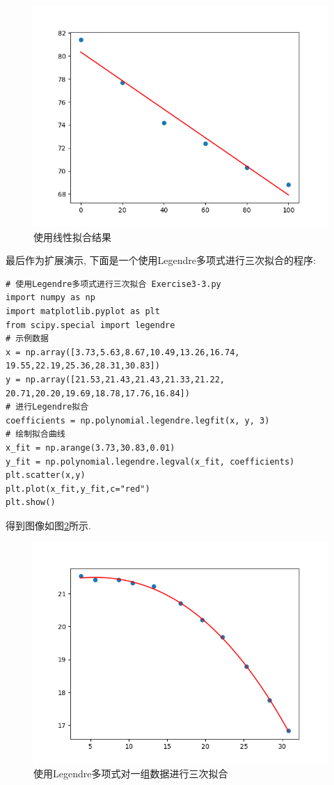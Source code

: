 \begin{figure}[h]
    \centering
    \includegraphics[width=1\linewidth]{Chapter3/graph/python/Figure3-1.png}
    \caption{使用线性拟合结果}
    \label{fig:使用线性拟合结果}
\end{figure}

最后作为扩展演示, 下面是一个使用Legendre多项式进行三次拟合的程序:

\begin{lstlisting}
# 使用Legendre多项式进行三次拟合 Exercise3-3.py
import numpy as np
import matplotlib.pyplot as plt
from scipy.special import legendre
# 示例数据
x = np.array([3.73,5.63,8.67,10.49,13.26,16.74,
19.55,22.19,25.36,28.31,30.83])
y = np.array([21.53,21.43,21.43,21.33,21.22,
20.71,20.20,19.69,18.78,17.76,16.84])
# 进行Legendre拟合
coefficients = np.polynomial.legendre.legfit(x, y, 3)
# 绘制拟合曲线
x_fit = np.arange(3.73,30.83,0.01)
y_fit = np.polynomial.legendre.legval(x_fit, coefficients)
plt.scatter(x,y)
plt.plot(x_fit,y_fit,c="red")
plt.show()
\end{lstlisting}

得到图像如图\ref{fig:使用Legendre多项式进行三次拟合}所示.

\begin{figure}[h]
    \centering
    \includegraphics[width=1\linewidth]{Chapter3/graph/python/Figure3-2.png}
    \caption{使用Legendre多项式对一组数据进行三次拟合}
    \label{fig:使用Legendre多项式进行三次拟合}
\end{figure}